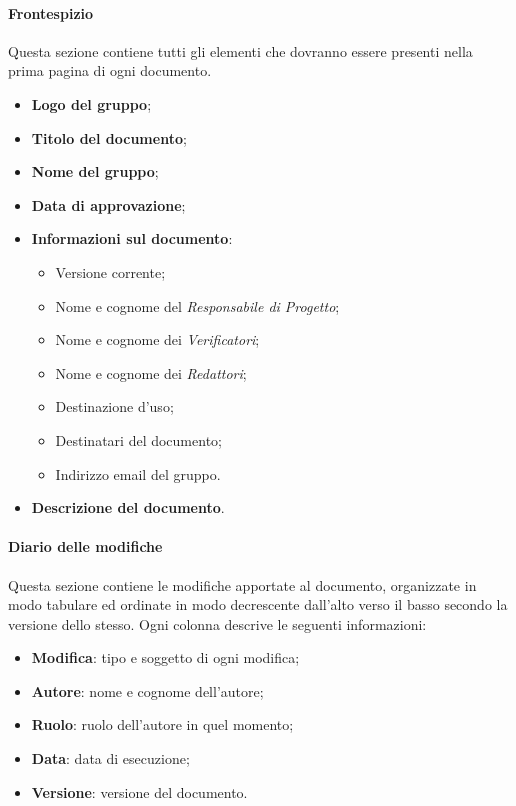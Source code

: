 \paragraph{Frontespizio} \Spazio
Questa sezione contiene tutti gli elementi che dovranno essere presenti nella prima pagina di ogni documento.
\begin{itemize}
	\item \textbf{Logo del gruppo};
	\item \textbf{Titolo del documento};
	\item \textbf{Nome del gruppo};
	\item \textbf{Data di approvazione};
	\item \textbf{Informazioni sul documento}:
	\begin{itemize}
		\item {Versione corrente};
		\item {Nome e cognome del \emph{Responsabile di Progetto}};
		\item {Nome e cognome dei \emph{Verificatori}};
		\item {Nome e cognome dei \emph{Redattori}};
		\item {Destinazione d'uso};
		\item {Destinatari del documento};
		\item {Indirizzo email del gruppo}.
	\end{itemize}
	\item \textbf{Descrizione del documento}.
\end{itemize}



\paragraph{Diario delle modifiche} \Spazio
Questa sezione contiene le modifiche apportate al documento, organizzate in modo tabulare ed ordinate in modo decrescente dall'alto verso il basso secondo la versione dello stesso. Ogni colonna descrive le seguenti informazioni:
\begin{itemize}
	\item \textbf{Modifica}: tipo e soggetto di ogni modifica;
	\item \textbf{Autore}: nome e cognome dell'autore;
	\item \textbf{Ruolo}: ruolo dell'autore in quel momento;
	\item \textbf{Data}: data di esecuzione;
	\item \textbf{Versione}: versione del documento.
\end{itemize}

